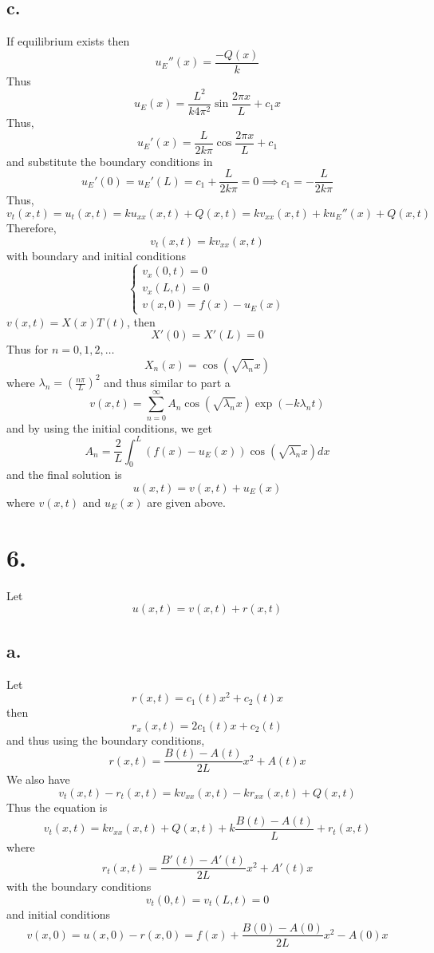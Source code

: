 \documentclass[11pt]{article}
\theoremstyle{mystyle}
\theoremstyle{definition}
\begin{document}
\subsection*{c.}
If equilibrium exists then 
\[
  u_E''(x) = \displaystyle\frac{-Q(x)}{k}
\]
Thus 
\[
  u_E(x) = \displaystyle\frac{L^2}{k 4\pi^2}\sin \displaystyle\frac{2\pi x}{L} + c_1 x 
\]
Thus, 
\[
  u_E'(x) = \displaystyle\frac{L}{2k\pi}\cos \displaystyle\frac{2\pi x}{L} + c_1 
\]
and substitute the boundary conditions in 
\[
  u_E'(0) = u_E'(L) = c_1 + \displaystyle\frac{L}{2k\pi}= 0 \implies c_1 = - \displaystyle\frac{L}{2k\pi}  
\]
Thus, 
\[
  v_t(x,t) = u_t(x,t) = ku_{xx}(x,t) + Q(x,t) = kv_{xx}(x,t) + ku_E''(x) + Q(x,t) 
\]
Therefore, 
\[
  v_t(x,t) = kv_{xx}(x,t)
\]
with boundary and initial conditions 
\[
  \begin{cases}
    v_x(0,t) = 0 \\
    v_x(L,t) = 0 \\
    v(x,0) = f(x) - u_E(x)
  \end{cases}
\]
$v(x,t) = X(x) T(t)$, then 
\[
  X'(0) = X'(L) = 0
\]
Thus for $n=0,1,2, \hdots$ 
\[
  X_n(x) = \cos(\sqrt{\lambda_n }x)
\]
where $\lambda_n = \left( \displaystyle\frac{n\pi}{L}\right)^2$
and thus similar to part a
\[
  v(x,t) = \sum_{n=0}^\infty A_n \cos(\sqrt{\lambda_n}x) \exp(-k \lambda_n t)
\]
and by using the initial conditions, we get 
\[
  A_n = \displaystyle\frac{2}{L} \int_0^L (f(x) - u_E(x)) \cos(\sqrt{\lambda_n}x) dx
\]
and the final solution is 
\[
  u(x,t) = v(x,t) + u_E(x)
\]
where $v(x,t)$ and $u_E(x)$ are given above. 
\newpage
\section*{6.}
Let 
\[
  u(x,t) = v(x,t) + r(x,t)
\]
\subsection*{a.}
Let 
\[
  r(x,t) = c_1(t) x^2 + c_2(t) x
\]
then 
\[
  r_x(x,t) = 2c_1(t)x + c_2(t) 
\]
and thus using the boundary conditions, 
\[
  r(x,t) = \displaystyle\frac{B(t) - A(t)}{2L} x^2 + A(t)x
\]
We also have 
\[
  v_t(x,t) - r_t(x,t) = k v_{xx}(x,t) - kr_{xx}(x,t) + Q(x, t)
\]
Thus the equation is 
\[
  v_t(x,t) = kv_{xx}(x,t) + Q(x,t) + k\displaystyle\frac{B(t) -A(t)}{L} + r_t(x,t)
\]
where 
\[
  r_t(x,t) = \displaystyle\frac{B'(t) - A'(t)}{2L}x^2 + A'(t)x
\]
with the boundary conditions 
\[
  v_t(0,t) = v_t(L, t) = 0
\]
and initial conditions 
\[
  v(x,0) = u(x,0) - r(x,0) = f(x) + \displaystyle\frac{B(0)-A(0)}{2L}x^2 - A(0)x
\]
\end{document}
